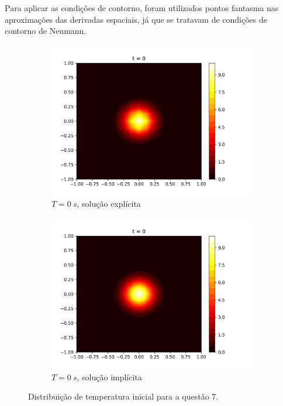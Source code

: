 \documentclass{article}
\begin{document}
Para aplicar as condições de contorno, foram utilizados pontos fantasma nas aproximações das derivadas espaciais, já que se tratavam de condições de contorno de Neumann.
\begin{figure}[h]
\centering
     \begin{subfigure}[b]{0.49\textwidth}
         \centering
         \includegraphics[width=\textwidth]{figs/q7a_heatmap_t0.png}
         \caption{$T=0~s$, solução explícita}
	\label{fig:q7a_heatmap_t0}
     \end{subfigure}
     \hfill
     \begin{subfigure}[b]{0.49\textwidth}
         \centering
     \includegraphics[width=\textwidth]{figs/q7b_heatmap_t0.png}
         \caption{$T=0~s$, solução implícita}
	\label{fig:q7b_heatmap_t0}
     \end{subfigure}
	\caption{Distribuição de temperatura inicial para a questão 7.}
\end{figure}
\end{document}
